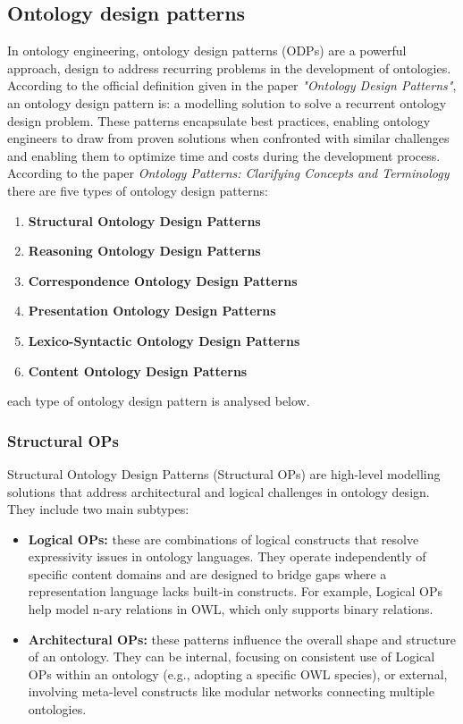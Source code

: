 \subsection{Ontology design patterns}
In ontology engineering, ontology design patterns (ODPs) are a powerful approach, design to address recurring problems in the development of ontologies.\cite{hitzler2016ontology}
According to the official definition given in the paper \textit{"Ontology Design Patterns"}, an ontology design pattern is: a modelling solution to solve a recurrent ontology design problem.\cite{gangemi2009ontology} These patterns encapsulate best practices, enabling ontology engineers to draw from proven solutions when confronted with similar challenges and enabling them to optimize time and costs during the development process. According to the paper \textit{Ontology Patterns: Clarifying Concepts and Terminology}\cite{falbo2013ontology} there are five types of ontology design patterns:
\begin{enumerate}
    \item \textbf{Structural Ontology Design Patterns}

    \item \textbf{Reasoning Ontology Design Patterns}

    \item \textbf{Correspondence Ontology Design Patterns}

    \item \textbf{Presentation Ontology Design Patterns}

    \item \textbf{Lexico-Syntactic Ontology Design Patterns}

    \item \textbf{Content Ontology Design Patterns}
\end{enumerate}
each type of ontology design pattern is analysed below. 

\subsubsection{Structural OPs}
Structural Ontology Design Patterns (Structural OPs) are high-level modelling solutions that address architectural and logical challenges in ontology design. They include two main subtypes:
\begin{itemize}
    \item \textbf{Logical OPs:} these are combinations of logical constructs that resolve expressivity issues in ontology languages. They operate independently of specific content domains and are designed to bridge gaps where a representation language lacks built-in constructs. For example, Logical OPs help model n-ary relations in OWL, which only supports binary relations.

    \item \textbf{Architectural OPs:} these patterns influence the overall shape and structure of an ontology. They can be internal, focusing on consistent use of Logical OPs within an ontology (e.g., adopting a specific OWL species), or external, involving meta-level constructs like modular networks connecting multiple ontologies.
\end{itemize}


